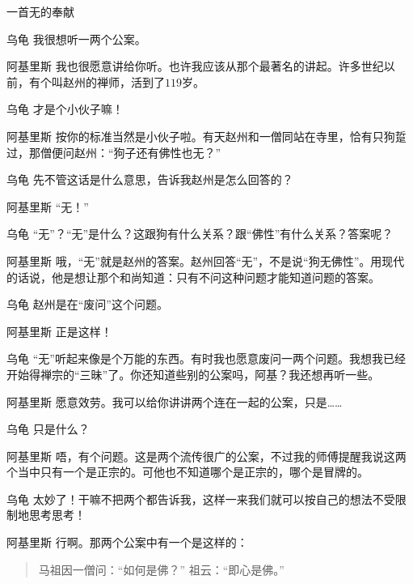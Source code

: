 \begin{dialog}{一首无的奉献\label{abcd}}
\begin{dialogue}
\item[乌龟]我很想听一两个公案。

\item[阿基里斯]我也很愿意讲给你听。也许我应该从那个最著名的讲起。许多世纪以前，有个叫赵州的禅师，活到了$119$岁。

\item[乌龟]才是个小伙子嘛！

\item[阿基里斯]按你的标准当然是小伙子啦。有天赵州和一僧同站在寺里，恰有只狗踅过，那僧便问赵州：“狗子还有佛性也无？”

\item[乌龟]先不管这话是什么意思，告诉我赵州是怎么回答的？

\item[阿基里斯]“无！”

\item[乌龟]“无”？“无”是什么？这跟狗有什么关系？跟“佛性”有什么关系？答案呢？

\item[阿基里斯]哦，“无”就是赵州的答案。赵州回答“无”，不是说“狗无佛性”。用现代的话说，他是想让那个和尚知道：只有不问这种问题才能知道问题的答案。

\item[乌龟]赵州是在“废问”这个问题。

\item[阿基里斯]正是这样！

\item[乌龟]“无”听起来像是个万能的东西。有时我也愿意废问一两个问题。我想我已经开始得禅宗的“三昧”了。你还知道些别的公案吗，阿基？我还想再听一些。

\item[阿基里斯]愿意效劳。我可以给你讲讲两个连在一起的公案，只是……

\item[乌龟]只是什么？

\item[阿基里斯]唔，有个问题。这是两个流传很广的公案，不过我的师傅提醒我说这两个当中只有一个是正宗的。可他也不知道哪个是正宗的，哪个是冒牌的。

\item[乌龟]太妙了！干嘛不把两个都告诉我，这样一来我们就可以按自己的想法不受限制地思考思考！

\item[阿基里斯]行啊。那两个公案中有一个是这样的：
\begin{quote}
马祖因一僧问：“如何是佛？”
祖云：“即心是佛。”
\end{quote}


\end{dialogue}
\end{dialog}
